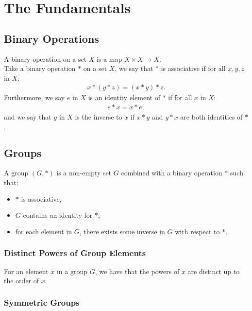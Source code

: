 \section{The Fundamentals}

\subsection{Binary Operations}

A binary operation on a set $X$ is a map $X \times X \to X$.
\\[\baselineskip]
Take a binary operation $\ast$ on a set $X$, we say that $\ast$ is 
associative if for all $x, y, z$ in $X$: \begin{align*}
    x \ast (y \ast z) = (x \ast y) \ast z.
\end{align*} Furthermore, we say $e$ in $X$ is an identity element of $\ast$ if
for all $x$ in $X$: \begin{align*}
    e \ast x = x \ast e,
\end{align*} and we say that $y$ in $X$ is the inverse to $x$ if
$x \ast y$ and $y \ast x$ are both identities of $\ast$.

\subsection{Groups}

A group $(G, \ast)$ is a non-empty set $G$ combined with a binary operation
$\ast$ such that: \begin{itemize}
    \item $\ast$ is associative,
    \item $G$ contains an identity for $\ast$,
    \item for each element in $G$, there exists some inverse in $G$ 
        with respect to $\ast$.
\end{itemize}

\subsubsection{Distinct Powers of Group Elements}

For an element $x$ in a group $G$, we have that the powers of $x$ are distinct
up to the order of $x$.

\subsubsection{Symmetric Groups}

